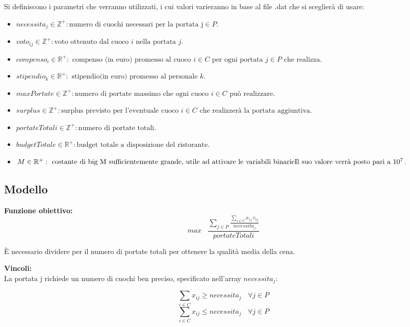 \documentclass[../modello-progetto.tex]{subfiles}
\begin{document}
Si definiscono i parametri che verranno utilizzati, i cui valori varieranno in base al file .dat che si sceglierà di usare:
\begin{itemize}
	\item $necessita_j \in \mathbb{Z}^+: \mbox{numero di cuochi necessari per la portata j} \in P$.
	\item $voto_{ij} \in \mathbb{Z}^+: \mbox{voto ottenuto dal cuoco } i \mbox{ nella portata } j $.
	\item $compenso_i \in \mathbb{R}^+: \mbox{ compenso (in euro) promesso al cuoco } i \in C \mbox{ per ogni portata } j \in P \mbox{ che realizza}$.
	\item $stipendio_k \in \mathbb{R}^+: \mbox{ stipendio(in euro) promesso al personale } k$.
	\item $ maxPortate \in \mathbb{Z}^+: \mbox{numero di portate massimo che ogni cuoco } i \in C \mbox{ può realizzare}$.
	\item $ surplus \in \mathbb{Z}^+: \mbox{surplus previsto per l'eventuale cuoco } i \in C \mbox{ che realizzerà la portata aggiuntiva}$.
	\item $ portateTotali \in \mathbb{Z}^+: \mbox{numero di portate totali}$.
	\item $ budgetTotale \in \mathbb{R}^+: \mbox{budget totale a disposizione del ristorante}$.
	\item $ M \in \mathbb{R}^+: \mbox{ costante di big M sufficientemente grande, utile ad attivare le variabili binarie} \\ \mbox{Il suo valore verrà posto pari a } 10^7$.
\end{itemize}

\subsection{Modello}
\label{sub:modello}

\textbf{Funzione obiettivo:}
\[
	max \: \: \: \: \frac{\sum_{j \in P}  \frac{\sum_{i \in C}{x_{ij} \: v_{ij}}}{necessita_j}}{portateTotali}
\]
\par È necessario dividere per il numero di portate totali per ottenere la qualità media della cena. \newline

\noindent \textbf{Vincoli:} \\
La portata j richiede un numero di cuochi ben preciso, specificato nell'array  $necessita_j$:

\[
	\sum_{i \in C} x_{ij} \geq necessita_j  \: \: \: \: \forall j \in P
\]
\[
	\sum_{i \in C} x_{ij} \leq necessita_j  \: \: \: \: \forall j \in P
\]
\end{document}
